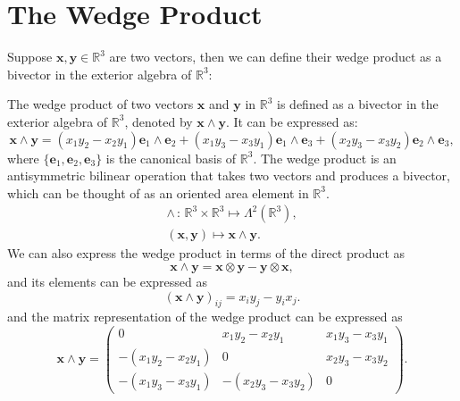 \section{The Wedge Product}

Suppose \(\mathbf{x}, \mathbf{y} \in \mathbb{R}^3\) are two vectors, then we can define their wedge product as a bivector in the exterior algebra of \(\mathbb{R}^3\):

\begin{definition}
    The wedge product of two vectors \(\mathbf{x}\) and \(\mathbf{y}\) in \(\mathbb{R}^3\) is defined as a bivector in the exterior algebra of \(\mathbb{R}^3\), denoted by \(\mathbf{x} \wedge \mathbf{y}\). It can be expressed as:
    \[
        \mathbf{x} \wedge \mathbf{y} = (x_1 y_2 - x_2 y_1) \mathbf{e}_1 \wedge \mathbf{e}_2 + (x_1 y_3 - x_3 y_1) \mathbf{e}_1 \wedge \mathbf{e}_3 + (x_2 y_3 - x_3 y_2) \mathbf{e}_2 \wedge \mathbf{e}_3,
    \]
    where \(\{\mathbf{e}_1, \mathbf{e}_2, \mathbf{e}_3\}\) is the canonical basis of \(\mathbb{R}^3\). The wedge product is an antisymmetric bilinear operation that takes two vectors and produces a bivector, which can be thought of as an oriented area element in \(\mathbb{R}^3\).
    \[
        \begin{aligned}
            \wedge \, : \, \mathbb{R}^3 \times \mathbb{R}^3 \mapsto \Lambda^2(\mathbb{R}^3), \\
            (\mathbf{x}, \mathbf{y}) \mapsto \mathbf{x} \wedge \mathbf{y}.
        \end{aligned}
    \]
    We can also express the wedge product in terms of the direct product as
    \[
        \mathbf{x} \wedge \mathbf{y} = \mathbf{x} \otimes \mathbf{y} - \mathbf{y} \otimes \mathbf{x},
    \]
    and its elements can be expressed as
    \[
        (\mathbf{x} \wedge \mathbf{y})_{ij} = x_i y_j - y_i x_j.
    \]
    and the matrix representation of the wedge product can be expressed as
    \[
        \mathbf{x} \wedge \mathbf{y} = \begin{pmatrix}
            0                    & x_1 y_2 - x_2 y_1    & x_1 y_3 - x_3 y_1 \\
            -(x_1 y_2 - x_2 y_1) & 0                    & x_2 y_3 - x_3 y_2 \\
            -(x_1 y_3 - x_3 y_1) & -(x_2 y_3 - x_3 y_2) & 0
        \end{pmatrix}.
    \]
\end{definition}

